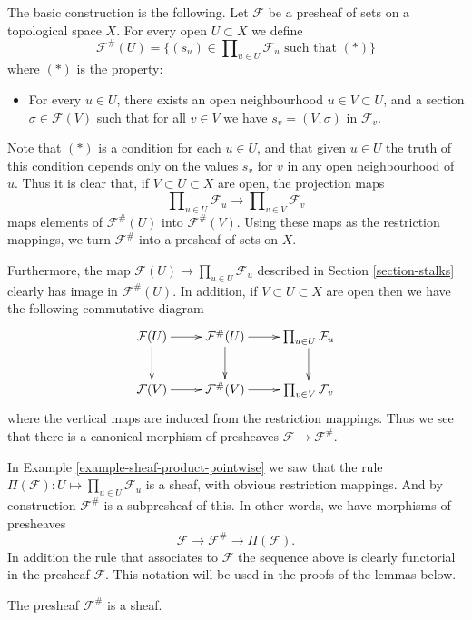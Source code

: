 \medskip\noindent
The basic construction is the following. Let $\mathcal{F}$ be a presheaf
of sets on a topological space $X$.
For every open $U \subset X$ we define
$$
\mathcal{F}^{\#}(U)
=
\{
(s_u) \in \prod\nolimits_{u \in U} \mathcal{F}_u
\text{ such that }(*)
\}
$$
where $(*)$ is the property:
\begin{itemize}
\item[(*)] For every $u \in U$, there exists an open neighbourhood
$u \in V \subset U$, and a section $\sigma \in \mathcal{F}(V)$
such that for all $v \in V$ we have $s_v = (V, \sigma)$
in $\mathcal{F}_v$.
\end{itemize}
Note that $(*)$ is a condition for each $u \in U$,
and that given $u \in U$ the truth of this condition
depends only on the values $s_v$ for $v$ in any open neighbourhood
of $u$. Thus it is clear that,
if $V \subset U \subset X$ are open, the projection maps
$$
\prod\nolimits_{u \in U} \mathcal{F}_u
\longrightarrow
\prod\nolimits_{v \in V} \mathcal{F}_v
$$
maps elements of $\mathcal{F}^{\#}(U)$ into $\mathcal{F}^{\#}(V)$.
Using these maps as the restriction mappings, we turn $\mathcal{F}^\#$
into a presheaf of sets on $X$.

\medskip\noindent
Furthermore, the map $\mathcal{F}(U) \to \prod_{u \in U} \mathcal{F}_u$
described in Section \ref{section-stalks} clearly has image
in $\mathcal{F}^{\#}(U)$. In addition, if $V \subset U \subset X$ are
open then we have the following commutative diagram
$$
\xymatrix{
\mathcal{F}(U) \ar[r] \ar[d] &
\mathcal{F}^{\#}(U) \ar[r] \ar[d] &
\prod_{u\in U} \mathcal{F}_u \ar[d] \\
\mathcal{F}(V) \ar[r] &
\mathcal{F}^{\#}(V) \ar[r] &
\prod_{v\in V} \mathcal{F}_v
}
$$
where the vertical maps are induced from the
restriction mappings. Thus we see that
there is a canonical morphism of presheaves
$\mathcal{F} \to \mathcal{F}^{\#}$.

\medskip\noindent
In Example \ref{example-sheaf-product-pointwise} we saw
that the rule $\Pi(\mathcal{F}) : U \mapsto \prod_{u\in U} \mathcal{F}_u$
is a sheaf, with obvious restriction mappings. And by construction
$\mathcal{F}^{\#}$ is a subpresheaf of this. In other words, we
have morphisms of presheaves
$$
\mathcal{F} \to \mathcal{F}^\# \to \Pi(\mathcal{F}).
$$
In addition the rule that associates to $\mathcal{F}$
the sequence above is clearly functorial in the presheaf $\mathcal{F}$.
This notation will be
used in the proofs of the lemmas below.

\begin{lemma}
\label{lemma-sheafification-sheaf}
\begin{reference}
\cite[Chapter I, \S 1, no. 3, pp. 200--201]{FAC}
\end{reference}
The presheaf $\mathcal{F}^{\#}$ is a sheaf.
\end{lemma}

